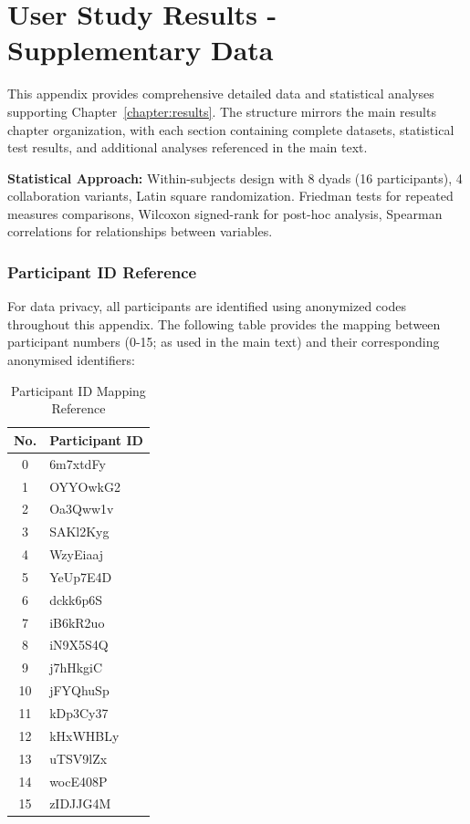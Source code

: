 \chapter{User Study Results - Supplementary Data}
\label{appendix:results}

This appendix provides comprehensive detailed data and statistical analyses supporting Chapter~\ref{chapter:results}. The structure mirrors the main results chapter organization, with each section containing complete datasets, statistical test results, and additional analyses referenced in the main text.

\textbf{Statistical Approach:} Within-subjects design with 8 dyads (16 participants), 4 collaboration variants, Latin square randomization. Friedman tests for repeated measures comparisons, Wilcoxon signed-rank for post-hoc analysis, Spearman correlations for relationships between variables.

\subsection{Participant ID Reference}

For data privacy, all participants are identified using anonymized codes throughout this appendix. The following table provides the mapping between participant numbers (0-15; as used in the main text) and their corresponding anonymised identifiers:

\begin{table}[H]
\centering
\caption{Participant ID Mapping Reference}
\label{tab:participant_id_mapping}
\begin{tabular}{cl}
\toprule
\textbf{No.} & \textbf{Participant ID} \\
\midrule
0 & 6m7xtdFy \\
1 & OYYOwkG2 \\
2 & Oa3Qww1v \\
3 & SAKl2Kyg \\
4 & WzyEiaaj \\
5 & YeUp7E4D \\
6 & dckk6p6S \\
7 & iB6kR2uo \\
8 & iN9X5S4Q \\
9 & j7hHkgiC \\
10 & jFYQhuSp \\
11 & kDp3Cy37 \\
12 & kHxWHBLy \\
13 & uTSV9lZx \\
14 & wocE408P \\
15 & zIDJJG4M \\
\bottomrule
\end{tabular}
\end{table}

